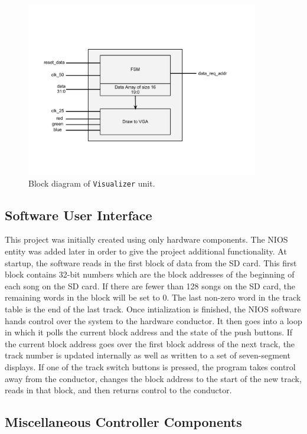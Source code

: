 \documentclass{article}
\begin{document}
\begin{figure}[H]
	\centering
	\includegraphics[width=4in]{viz_block_diagram}
	\caption{Block diagram of \texttt{Visualizer} unit.}
\end{figure}

\subsection{Software User Interface}

This project was initially created using only hardware components. The NIOS 
entity was added later in order to give the project additional functionality. 
At startup, the software reads in the first block of data from the SD card. 
This first block contains 32-bit numbers which are the block addresses of the 
beginning of each song on the SD card. If there are fewer than 128 songs on the 
SD card, the remaining words in the block will be set to 0. The last non-zero 
word in the track table is the end of the last track. Once intialization is
finished, the NIOS software hands control over the system to the hardware
conductor. It then goes into a loop in which it polls the current block address
and the state of the push buttons. If the current block address goes over the 
first block address of the next track, the track number is updated internally
as well as written to a set of seven-segment displays. If one of the track 
switch buttons is pressed, the program takes control away from the conductor,
changes the block address to the start of the new track, reads in that block,
and then returns control to the conductor.

\subsection{Miscellaneous Controller Components}
\end{document}
